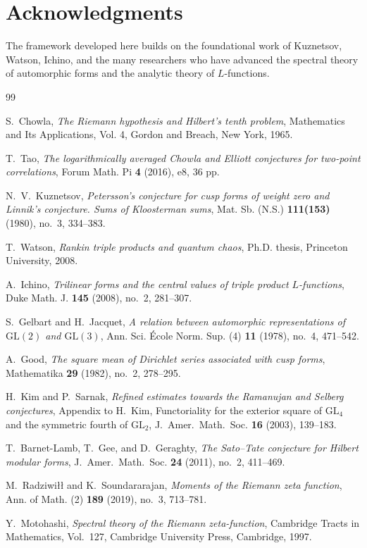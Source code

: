 \documentclass[11pt,a4paper]{article}
\theoremstyle{plain}
\theoremstyle{definition}
\newcommand{\GL}{\mathrm{GL}}
\begin{document}
\section*{Acknowledgments}

The framework developed here builds on the foundational work of Kuznetsov, Watson, Ichino, and the many researchers who have advanced the spectral theory of automorphic forms and the analytic theory of $L$-functions.

\begin{thebibliography}{99}

S.~Chowla, {\it The Riemann hypothesis and Hilbert's tenth problem},
Mathematics and Its Applications, Vol. 4, Gordon and Breach, New York, 1965.

T.~Tao, {\it The logarithmically averaged Chowla and Elliott conjectures for two-point correlations},
Forum Math. Pi \textbf{4} (2016), e8, 36 pp.

N.~V.~Kuznetsov, {\it Petersson's conjecture for cusp forms of weight zero and Linnik's conjecture. Sums of Kloosterman sums},
Mat. Sb. (N.S.) \textbf{111(153)} (1980), no.~3, 334--383.

T.~Watson, {\it Rankin triple products and quantum chaos},
Ph.D. thesis, Princeton University, 2008.

A.~Ichino, {\it Trilinear forms and the central values of triple product $L$-functions},
Duke Math. J. \textbf{145} (2008), no.~2, 281--307.

S.~Gelbart and H.~Jacquet, {\it A relation between automorphic representations of $\GL(2)$ and $\GL(3)$},
Ann. Sci. \'{E}cole Norm. Sup. (4) \textbf{11} (1978), no.~4, 471--542.

A.~Good, {\it The square mean of Dirichlet series associated with cusp forms},
Mathematika \textbf{29} (1982), no.~2, 278--295.

H.~Kim and P.~Sarnak, {\it Refined estimates towards the Ramanujan and Selberg conjectures},
Appendix to H.~Kim, Functoriality for the exterior square of $\GL_4$ and the symmetric fourth of $\GL_2$, J.~Amer.~Math.~Soc. \textbf{16} (2003), 139--183.

T.~Barnet-Lamb, T.~Gee, and D.~Geraghty, {\it The Sato--Tate conjecture for Hilbert modular forms},
J.~Amer.~Math.~Soc. \textbf{24} (2011), no.~2, 411--469.

M.~Radziwi\l\l{} and K.~Soundararajan, {\it Moments of the Riemann zeta function},
Ann. of Math. (2) \textbf{189} (2019), no.~3, 713--781.

Y.~Motohashi, {\it Spectral theory of the Riemann zeta-function},
Cambridge Tracts in Mathematics, Vol.~127, Cambridge University Press, Cambridge, 1997.

\end{thebibliography}
\end{document}
